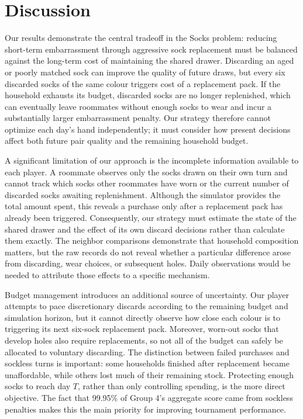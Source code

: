 \documentclass[11pt]{article}
\begin{document}


\section{Discussion}

Our results demonstrate the central tradeoff in the Socks problem: reducing short-term embarrassment through aggressive sock replacement must be balanced against the long-term cost of maintaining the shared drawer. Discarding an aged or poorly matched sock can improve the quality of future draws, but every six discarded socks of the same colour triggers cost of a replacement pack. If the household exhausts its budget, discarded socks are no longer replenished, which can eventually leave roommates without enough socks to wear and incur a substantially larger embarrassment penalty. Our strategy therefore cannot optimize each day's hand independently; it must consider how present decisions affect both future pair quality and the remaining household budget.

A significant limitation of our approach is the incomplete information available to each player. A roommate observes only the socks drawn on their own turn and cannot track which socks other roommates have worn or the current number of discarded socks awaiting replenishment. Although the simulator provides the total amount spent, this reveals a purchase only after a replacement pack has already been triggered. Consequently, our strategy must estimate the state of the shared drawer and the effect of its own discard decisions rather than calculate them exactly. The neighbor comparisons demonstrate that household composition matters, but the raw records do not reveal whether a particular difference arose from discarding, wear choices, or subsequent holes. Daily observations would be needed to attribute those effects to a specific mechanism.

Budget management introduces an additional source of uncertainty. Our player attempts to pace discretionary discards according to the remaining budget and simulation horizon, but it cannot directly observe how close each colour is to triggering its next six-sock replacement pack. Moreover, worn-out socks that develop holes also require replacements, so not all of the budget can safely be allocated to voluntary discarding. The distinction between failed purchases and sockless turns is important: some households finished after replacement became unaffordable, while others lost much of their remaining stock. Protecting enough socks to reach day \(T\), rather than only controlling spending, is the more direct objective. The fact that 99.95\% of Group 4's aggregate score came from sockless penalties makes this the main priority for improving tournament performance.
\end{document}

